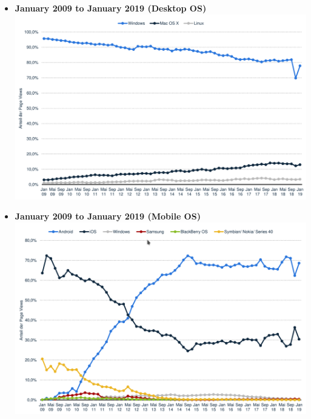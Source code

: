 \begin{itemize}
\item
  \textbf{January 2009 to January 2019 (Desktop OS)}
  \includegraphics{images/os_dist_d_2009-2019.png}
\item
  \textbf{January 2009 to January 2019 (Mobile OS)}
  \includegraphics{images/os_dist_m_2009-2019.png}
\end{itemize}
